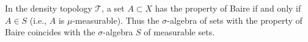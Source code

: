 In the density topology $\mathcal{T}$, a set $A \subset X$ has the property of Baire if and only if $A \in S$ (i.e., $A$ is $\mu$-measurable). Thus the $\sigma$-algebra of sets with the property of Baire coincides with the $\sigma$-algebra $S$ of measurable sets.
